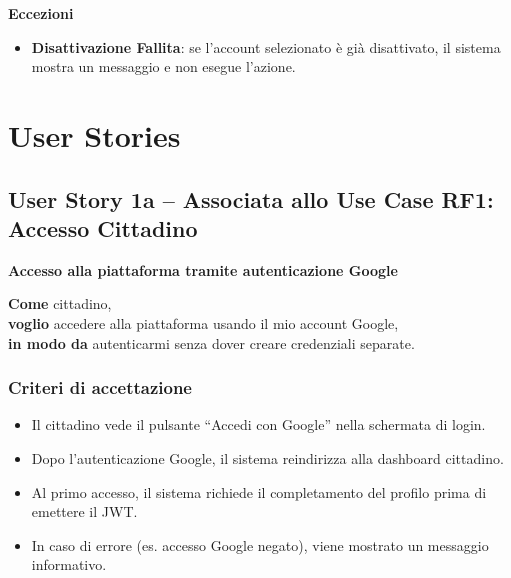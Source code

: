 \documentclass{article}
\begin{document}
\textbf{Eccezioni}
\begin{itemize}
    \item \textbf{Disattivazione Fallita}: se l'account selezionato è già disattivato, il sistema mostra un messaggio e non esegue l'azione.
\end{itemize}


\section{User Stories}

\subsection{User Story 1a -- Associata allo Use Case RF1: Accesso Cittadino}

\textbf{Accesso alla piattaforma tramite autenticazione Google}

\textbf{Come} cittadino,\\
\textbf{voglio} accedere alla piattaforma usando il mio account Google,\\
\textbf{in modo da} autenticarmi senza dover creare credenziali separate.

\subsubsection{Criteri di accettazione}
\begin{itemize}
    \item Il cittadino vede il pulsante ``Accedi con Google'' nella schermata di login.
    \item Dopo l'autenticazione Google, il sistema reindirizza alla dashboard cittadino.
    \item Al primo accesso, il sistema richiede il completamento del profilo prima di emettere il JWT.
    \item In caso di errore (es. accesso Google negato), viene mostrato un messaggio informativo.
\end{itemize}
\end{document}
